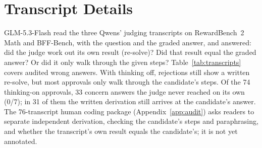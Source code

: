 \documentclass[11pt]{article}
\begin{document}
\begin{table}[h]
\centering
\small
\setlength{\tabcolsep}{3pt}
\caption{Majority votes at a matched budget on 1,369 original items (\%). Three samples: the judge's original verdict
and two repeats. Range of balanced accuracy over the 17 three-family juries: 81.1--88.3.}
\label{tab:jury}
\end{table}

\section{Transcript Details}
\label{app:transcripts}

GLM-5.3-Flash read the three Qwens' judging transcripts on RewardBench~2 Math and BFF-Bench, with the question and
the graded answer, and answered: did the judge work out its own result (re-solve)? Did that result equal the graded
answer? Or did it only walk through the given steps? Table~\ref{tab:transcripts} covers audited wrong answers.
With thinking off, rejections still show a written re-solve, but most approvals only walk through the candidate's
steps. Of the 74 thinking-on approvals, 33 concern answers the judge never reached on its own (0/7); in 31 of them
the written derivation still arrives at the candidate's answer. The 76-transcript human coding package (Appendix~\ref{app:audit}) asks readers to separate independent
derivation, checking the candidate's steps and paraphrasing, and whether the transcript's own result equals the
candidate's; it is not yet annotated.
\end{document}
